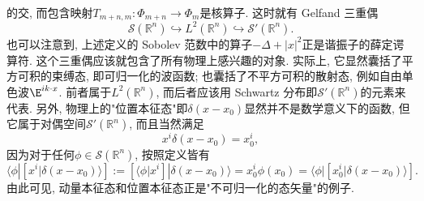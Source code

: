的交, 而包含映射$T_{m+n,m}:\Phi_{m+n}\to\Phi_m$是核算子. 这时就有 Gelfand 三重偶$$
\mathcal{S}(\mathbb{R}^n)\hookrightarrow L^2(\mathbb{R}^n)\hookrightarrow \mathcal{S}'(\mathbb{R}^n).
$$也可以注意到, 上述定义的 Sobolev 范数中的算子$-\Delta+|x|^2$正是谐振子的薛定谔算符.
      这个三重偶应该就包含了所有物理上感兴趣的对象. 实际上, 它显然囊括了平方可积的束缚态, 即可归一化的波函数; 也囊括了不平方可积的散射态, 例如自由单色波$\E^{ik\cdot x}$. 前者属于$L^2(\mathbb{R}^n)$, 而后者应该用 Schwartz 分布即$\mathcal{S}'(\mathbb{R}^n)$的元素来代表. 另外, 物理上的"位置本征态"即$\delta(x-x_0)$显然并不是数学意义下的函数, 但它属于对偶空间$\mathcal{S}'(\mathbb{R}^n)$, 而且当然满足$$
x^i\delta(x-x_0)=x_0^i,
$$因为对于任何$\phi\in\mathcal{S}(\mathbb{R}^n)$, 按照定义皆有$$
\langle\phi|\left[x^i|\delta(x-x_0)\rangle\right]:=\left[\langle\phi|x^i\right]|\delta(x-x_0)\rangle
=x_0^i\phi(x_0)=\langle\phi|\left[x_0^i|\delta(x-x_0)\rangle\right].
$$由此可见, 动量本征态和位置本征态正是"不可归一化的态矢量"的例子.
